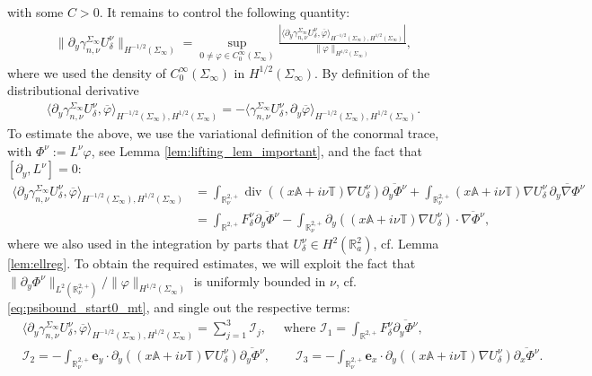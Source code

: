 \documentclass[report]{elsarticle}
\numberwithin{theorem}{section}
\renewcommand{\vec}[1]{\mathbf{#1}}
\begin{document}
with some $C>0$. It remains to control the following quantity:
\begin{align}
	\label{eq:unudelta_trace}
	\|\partial_y \gamma_{n, \nu}^{\Sigma_{\infty}}U^{\nu}_{\delta}\|_{H^{-1/2}(\Sigma_{\infty})}=\sup\limits_{0\neq\varphi\in C_0^{\infty}(\Sigma_{\infty})}\frac{\left|\langle \partial_y \gamma_{n, \nu}^{\Sigma_{\infty}}U^{\nu}_{\delta}, \overline{\varphi}\rangle_{H^{-1/2}(\Sigma_{\infty}), H^{1/2}(\Sigma_{\infty})}\right| }{\|\varphi\|_{H^{1/2}(\Sigma_{\infty})}},
\end{align}
where we used the density of $C_0^{\infty}(\Sigma_{\infty})$ in $H^{1/2}(\Sigma_{\infty})$.  By definition of the distributional derivative 
\begin{align*}
	\langle \partial_y \gamma_{n, \nu}^{\Sigma_{\infty}}U^{\nu}_{\delta}, \overline{\varphi}\rangle_{H^{-1/2}(\Sigma_{\infty}), H^{1/2}(\Sigma_{\infty})}=-\langle  \gamma_{n, \nu}^{\Sigma_{\infty}}U^{\nu}_{\delta}, \partial_y\overline{\varphi}\rangle_{H^{-1/2}(\Sigma_{\infty}), H^{1/2}(\Sigma_{\infty})}.
\end{align*} 
To estimate the above, we use the variational definition of the conormal trace, with $\Phi^{\nu}:=L^{\nu}\varphi$, see Lemma \ref{lem:lifting_lem_important}, and the fact that $[\partial_y, L^{\nu}]=0$: 
\begin{align*}
	\langle \partial_y \gamma_{n, \nu}^{\Sigma_{\infty}}U^{\nu}_{\delta}, \overline{\varphi}\rangle_{H^{-1/2}(\Sigma_{\infty}), H^{1/2}(\Sigma_{\infty})}&=\int_{\mathbb{R}^{2,+}_{\nu}}\operatorname{div}((x\mathbb{A}+i\nu\mathbb{T})\nabla U^{\nu}_{\delta})\overline{\partial_y\Phi^{\nu}}+\int_{\mathbb{R}^{2,+}_{\nu}}(x\mathbb{A}+i\nu\mathbb{T})\nabla U^{\nu}_{\delta}\,\overline{\partial_y\nabla \Phi^{\nu}}\\
	&=\int_{\mathbb{R}^{2,+}}F^{\nu}_{\delta}\overline{\partial_y \Phi^{\nu}}-\int_{\mathbb{R}^{2,+}_{\nu}}\partial_y\left((x\mathbb{A}+i\nu\mathbb{T})\nabla U^{\nu}_{\delta}\right)\cdot \overline{\nabla \Phi^{\nu}},
\end{align*}
where we also used in the integration by parts that $U^{\nu}_{\delta}\in H^2(\mathbb{R}^2_a)$, cf. Lemma \ref{lem:ellreg}. To obtain the required estimates, we will exploit the fact that $\|\partial_y \Phi^{\nu}\|_{L^2(\mathbb{R}^{2,+}_{\nu})}/\|\varphi\|_{H^{1/2}(\Sigma_{\infty})}$ is uniformly bounded in $\nu$, cf. \eqref{eq:psibound_start0_mt}, and single out the respective terms:
\begin{align}
	\label{eq:dyy}
	&\langle \partial_y \gamma_{n, \nu}^{\Sigma_{\infty}}U^{\nu}_{\delta}, \overline{\varphi}\rangle_{H^{-1/2}(\Sigma_{\infty}), H^{1/2}(\Sigma_{\infty})}=\sum\limits_{j=1}^3 \mathcal{I}_{j},\quad \text{ where } \mathcal{I}_1=\int_{\mathbb{R}^{2,+}}F^{\nu}_{\delta}\overline{\partial_y \Phi^{\nu}},\\
	\nonumber
	&\mathcal{I}_2=-\int_{\mathbb{R}^{2,+}_{\nu}}\vec{e}_y\cdot\partial_y\left((x\mathbb{A}+i\nu\mathbb{T})\nabla U^{\nu}_{\delta}\right) \overline{\partial_y \Phi^{\nu}}, \qquad 
	\mathcal{I}_3=-
	\int_{\mathbb{R}^{2,+}_{\nu}}\vec{e}_x \cdot\partial_y\left((x\mathbb{A}+i\nu\mathbb{T})\nabla U^{\nu}_{\delta}\right)\overline{\partial_x \Phi^{\nu}}.
\end{align}
\end{document}
